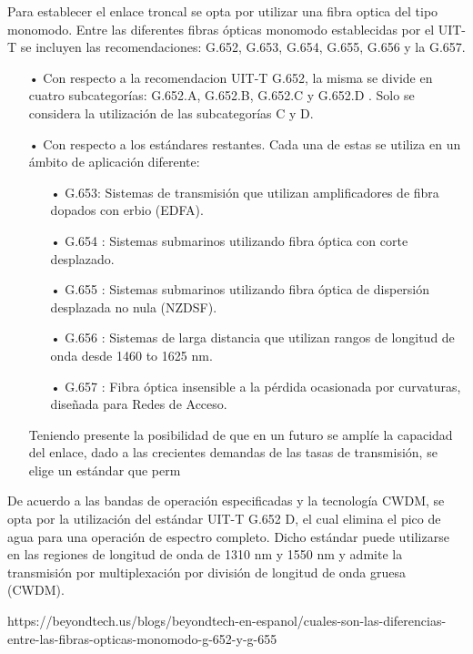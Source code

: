Para establecer el enlace troncal se opta por utilizar una fibra optica del tipo monomodo. Entre las diferentes fibras ópticas monomodo establecidas por el UIT-T se incluyen las recomendaciones: G.652, G.653, G.654, G.655, G.656 y la G.657.
\begin{enumerate}
\item[•]Con respecto a la recomendacion UIT-T G.652, la misma se divide en cuatro subcategorías: G.652.A, G.652.B, G.652.C y G.652.D . Solo se considera la utilización de las subcategorías C y D.

\item[•]Con respecto a los estándares restantes. Cada una de estas se utiliza en un ámbito de aplicación diferente:

\begin{enumerate}
 \item[•]G.653: Sistemas de transmisión que utilizan amplificadores de fibra dopados con erbio (EDFA).
 
 \item[•]G.654 : Sistemas submarinos utilizando fibra óptica con corte desplazado.
 
 \item[•]G.655 : Sistemas submarinos utilizando fibra óptica de dispersión desplazada no nula (NZDSF).
 
 \item[•]G.656 : Sistemas de larga distancia que utilizan rangos de longitud de onda desde 1460 to 1625 nm.
 
 \item[•]G.657 : Fibra óptica insensible a la pérdida ocasionada por curvaturas, diseñada para Redes de Acceso.

\end{enumerate}

Teniendo presente la posibilidad de que en un futuro se amplíe la capacidad del enlace, dado a las crecientes demandas de las tasas de transmisión, se elige un estándar que perm

\end{enumerate}

De acuerdo a las bandas de operación especificadas y la tecnología CWDM, se opta por la utilización del estándar UIT-T G.652 D, el cual elimina el pico de agua para una operación de espectro completo. Dicho estándar puede utilizarse en las regiones de longitud de onda de 1310 nm y 1550 nm y admite la transmisión por multiplexación por división de longitud de onda gruesa (CWDM).


https://beyondtech.us/blogs/beyondtech-en-espanol/cuales-son-las-diferencias-entre-las-fibras-opticas-monomodo-g-652-y-g-655

